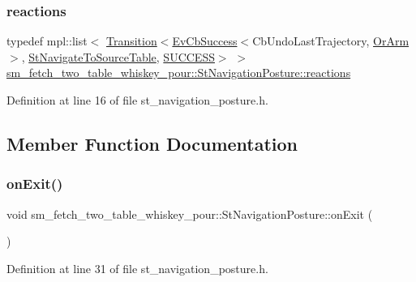 \subsubsection{\texorpdfstring{reactions}{reactions}}
{\footnotesize\ttfamily typedef mpl\+::list$<$ \hyperlink{classsmacc_1_1Transition}{Transition}$<$\hyperlink{structsmacc_1_1EvCbSuccess}{Ev\+Cb\+Success}$<$Cb\+Undo\+Last\+Trajectory, \hyperlink{classsm__fetch__two__table__whiskey__pour_1_1OrArm}{Or\+Arm}$>$, \hyperlink{structsm__fetch__two__table__whiskey__pour_1_1StNavigateToSourceTable}{St\+Navigate\+To\+Source\+Table}, \hyperlink{structsmacc_1_1default__transition__tags_1_1SUCCESS}{S\+U\+C\+C\+E\+SS}$>$ $>$ \hyperlink{structsm__fetch__two__table__whiskey__pour_1_1StNavigationPosture_a02701594898d69b5e0feafab57af0593}{sm\+\_\+fetch\+\_\+two\+\_\+table\+\_\+whiskey\+\_\+pour\+::\+St\+Navigation\+Posture\+::reactions}}



Definition at line 16 of file st\+\_\+navigation\+\_\+posture.\+h.



\subsection{Member Function Documentation}
\mbox{\label{structsm__fetch__two__table__whiskey__pour_1_1StNavigationPosture_a5e0e6613c360a4787eea61e57c9820f9}} 
\subsubsection{\texorpdfstring{on\+Exit()}{onExit()}}
{\footnotesize\ttfamily void sm\+\_\+fetch\+\_\+two\+\_\+table\+\_\+whiskey\+\_\+pour\+::\+St\+Navigation\+Posture\+::on\+Exit (\begin{DoxyParamCaption}{ }\end{DoxyParamCaption})\hspace{0.3cm}{\ttfamily [inline]}}



Definition at line 31 of file st\+\_\+navigation\+\_\+posture.\+h.



